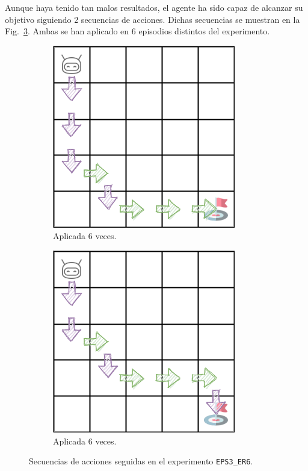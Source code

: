 Aunque haya tenido tan malos resultados, el agente ha sido capaz de alcanzar su objetivo siguiendo 2 secuencias de acciones. Dichas secuencias se muestran en la Fig.~\ref{fig:dim5_lr0.01_ep0.5_6}. Ambas se han aplicado en 6 episodios distintos del experimento.  \\ 
\begin{figure}
    \centering
    \begin{subfigure}{.5\textwidth}
        \centering
        \includegraphics[scale=0.4]{cap5_experimentacion/images/dim5_lr0.01_ep0.5_6_1.png}
        \caption{Aplicada 6 veces.}
        \label{fig:dim5_lr0.01_ep0.5_6_1}
    \end{subfigure}%
    \begin{subfigure}{.5\textwidth}
        \centering
        \includegraphics[scale=0.4]{cap5_experimentacion/images/dim5_lr0.01_ep0.5_6_2.png}
        \caption{Aplicada 6 veces.}
        \label{fig:dim5_lr0.01_ep0.5_6_2}
    \end{subfigure}
    \caption{Secuencias de acciones seguidas en el experimento \texttt{EPS3\_ER6}.}
    \label{fig:dim5_lr0.01_ep0.5_6}
\end{figure}

